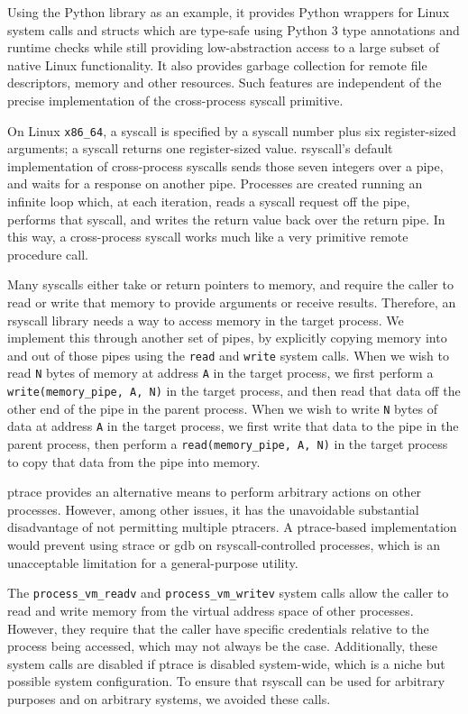 \documentclass{acmart}
\begin{document}
Using the Python library as an example,
it provides Python wrappers for Linux system calls and structs
which are type-safe using Python 3 type annotations and runtime checks
while still providing low-abstraction access to a large subset of native Linux functionality.
It also provides garbage collection for remote file descriptors, memory and other resources.
Such features are independent of the precise implementation of the cross-process syscall primitive.

On Linux \verb|x86_64|, a syscall is specified by a syscall number plus six register-sized arguments;
a syscall returns one register-sized value.
rsyscall's default implementation of cross-process syscalls sends those seven integers over a pipe,
and waits for a response on another pipe.
Processes are created running an infinite loop which, at each iteration,
reads a syscall request off the pipe,
performs that syscall,
and writes the return value back over the return pipe.
In this way, a cross-process syscall works much like a very primitive remote procedure call.

Many syscalls either take or return pointers to memory,
and require the caller to read or write that memory to provide arguments or receive results.
Therefore, an rsyscall library needs a way to access memory in the target process.
We implement this through another set of pipes,
by explicitly copying memory into and out of those pipes using the \texttt{read} and \texttt{write} system calls.
When we wish to read \texttt{N} bytes of memory at address \texttt{A} in the target process,
we first perform a \verb|write(memory_pipe, A, N)| in the target process,
and then read that data off the other end of the pipe in the parent process.
When we wish to write \texttt{N} bytes of data at address \texttt{A} in the target process,
we first write that data to the pipe in the parent process,
then perform a \verb|read(memory_pipe, A, N)| in the target process to copy that data from the pipe into memory.

ptrace provides an alternative means to perform arbitrary actions on other processes.
However, among other issues, it has the unavoidable substantial disadvantage of not permitting multiple ptracers.
A ptrace-based implementation would prevent using strace or gdb on rsyscall-controlled processes,
which is an unacceptable limitation for a general-purpose utility.

The \verb|process_vm_readv| and \verb|process_vm_writev| system calls
allow the caller to read and write memory from the virtual address space of other processes.
However, they require that the caller have specific credentials relative to the process being accessed,
which may not always be the case.
Additionally, these system calls are disabled if ptrace is disabled system-wide,
which is a niche but possible system configuration.
To ensure that rsyscall can be used for arbitrary purposes and on arbitrary systems, we avoided these calls.
\end{document}
